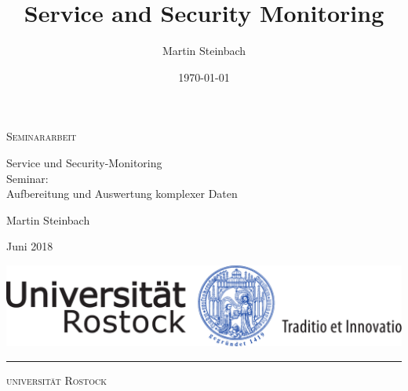 \documentclass[a4paper,10pt]{scrreprt}
\title{Service and Security Monitoring}
\author{Martin Steinbach}
\date{\today}
\begin{document}



\thispagestyle{empty}

\begin{center}
  
  {\Large \textsc{Seminararbeit}
  
  \vspace{4.25cm}
  
  {\fontsize{22}{22}\selectfont Service und Security-Monitoring\\}
  \vspace{0.75cm}
  {\fontsize{20}{20}\selectfont Seminar:\\ Aufbereitung und Auswertung komplexer Daten}
}
  
  \vspace{7.25cm}
  
  {\Large Martin Steinbach
    
    \vspace{.15cm}
    
    Juni 2018}
  
  \vspace{1.5cm}
  
  
  \includegraphics[scale=0.5]{img/siegel}
  
  \vspace{0.5cm}
  
  \rule{.7\textwidth}{.40pt}
  
  \vspace{.5cm}
  
  {\large\textsc{universität Rostock}}
    
    \vspace{.15cm}
        
\end{center}
\newpage 
\thispagestyle{empty}
\quad  \addtocounter{page}{-2}
\newpage
 
\end{document}
